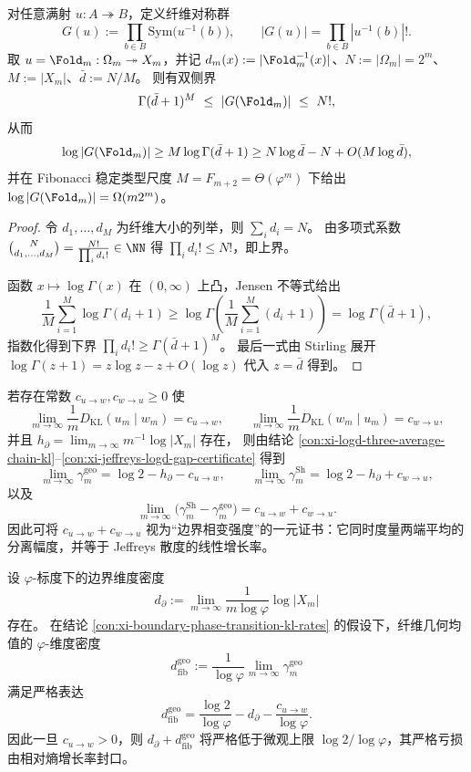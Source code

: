 \begin{proposition}\label{prop:xi-fold-fiber-symmetry-group-entropy-lower}
对任意满射 \(u:A\twoheadrightarrow B\)，定义纤维对称群
\[
G(u):=\prod_{b\in B}\mathrm{Sym}\bigl(u^{-1}(b)\bigr),
\qquad
|G(u)|=\prod_{b\in B}|u^{-1}(b)|!.
\]
取 \(u=\Fold_m:\Omega_m\twoheadrightarrow X_m\)，并记 \(d_m(x):=|\Fold_m^{-1}(x)|\)、\(N:=|\Omega_m|=2^m\)、\(M:=|X_m|\)、\(\bar d:=N/M\)。
则有双侧界
\[
\Gamma(\bar d+1)^{M}\ \le\ |G(\Fold_m)|\ \le\ N!,
\]
从而
\[
\log|G(\Fold_m)|
\ge
M\log\Gamma(\bar d+1)
\ge
N\log\bar d-N+O(M\log\bar d),
\]
并在 Fibonacci 稳定类型尺度 \(M=F_{m+2}=\Theta(\varphi^m)\) 下给出
\(
\log|G(\Fold_m)|=\Omega(m2^m)
\)。
\end{proposition}
\begin{proof}
令 \(d_1,\dots,d_M\) 为纤维大小的列举，则 \(\sum_i d_i=N\)。
由多项式系数
\(
\binom{N}{d_1,\dots,d_M}=\frac{N!}{\prod_i d_i!}\in\NN
\)
得 \(\prod_i d_i!\le N!\)，即上界。
\par
函数 \(x\mapsto \log\Gamma(x)\) 在 \((0,\infty)\) 上凸，Jensen 不等式给出
\[
\frac1M\sum_{i=1}^M\log\Gamma(d_i+1)\ge \log\Gamma\!\left(\frac1M\sum_{i=1}^M(d_i+1)\right)=\log\Gamma(\bar d+1),
\]
指数化得到下界 \(\prod_i d_i!\ge \Gamma(\bar d+1)^M\)。
最后一式由 Stirling 展开 \(\log\Gamma(z+1)=z\log z-z+O(\log z)\) 代入 \(z=\bar d\) 得到。
\end{proof}

\begin{conclusion}\label{con:xi-boundary-phase-transition-kl-rates}
若存在常数 \(c_{u\to w},c_{w\to u}\ge 0\) 使
\[
\lim_{m\to\infty}\frac{1}{m}D_{\mathrm{KL}}(u_m\mid w_m)=c_{u\to w},
\qquad
\lim_{m\to\infty}\frac{1}{m}D_{\mathrm{KL}}(w_m\mid u_m)=c_{w\to u},
\]
并且 \(h_\partial=\lim_{m\to\infty}m^{-1}\log|X_m|\) 存在，
则由结论 \ref{con:xi-logd-three-average-chain-kl}--\ref{con:xi-jeffreys-logd-gap-certificate} 得到
\[
\lim_{m\to\infty}\gamma_m^{\mathrm{geo}}=\log 2-h_\partial-c_{u\to w},
\qquad
\lim_{m\to\infty}\gamma_m^{\mathrm{Sh}}=\log 2-h_\partial+c_{w\to u},
\]
以及
\[
\lim_{m\to\infty}\bigl(\gamma_m^{\mathrm{Sh}}-\gamma_m^{\mathrm{geo}}\bigr)=c_{u\to w}+c_{w\to u}.
\]
因此可将 \(c_{u\to w}+c_{w\to u}\) 视为“边界相变强度”的一元证书：它同时度量两端平均的分离幅度，并等于 Jeffreys 散度的线性增长率。
\end{conclusion}

\begin{conclusion}\label{con:xi-fractal-dimension-entropy-deficit}
设 \(\varphi\)-标度下的边界维度密度
\[
d_\partial:=\lim_{m\to\infty}\frac{1}{m\log\varphi}\log|X_m|
\]
存在。
在结论 \ref{con:xi-boundary-phase-transition-kl-rates} 的假设下，纤维几何均值的 \(\varphi\)-维度密度
\[
d_{\mathrm{fib}}^{\mathrm{geo}}
:=\frac{1}{\log\varphi}\lim_{m\to\infty}\gamma_m^{\mathrm{geo}}
\]
满足严格表达
\[
d_{\mathrm{fib}}^{\mathrm{geo}}=\frac{\log 2}{\log\varphi}-d_\partial-\frac{c_{u\to w}}{\log\varphi}.
\]
因此一旦 \(c_{u\to w}>0\)，则 \(d_\partial+d_{\mathrm{fib}}^{\mathrm{geo}}\) 将严格低于微观上限 \(\log 2/\log\varphi\)，其严格亏损由相对熵增长率封口。
\end{conclusion}

